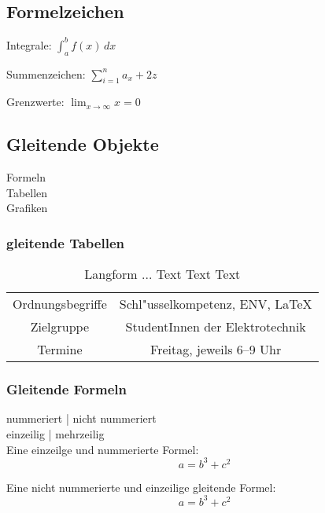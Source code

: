\documentclass[a4paper,12pt,titlepage]{article} %
\begin{document}
\subsection{Formelzeichen}
Integrale:
\begin{math}
 \int^b_a f(x)\,dx 
\end{math}

Summenzeichen:
\begin{math}
 \sum_{i=1}^n a_x +2z 
\end{math}

Grenzwerte:
\begin{math}
\lim_{x \rightarrow \infty} x=0
\end{math}

\subsection{Gleitende Objekte}
Formeln\\
Tabellen\\
Grafiken\\

\subsubsection{gleitende Tabellen}
\begin{table}[ht!] %
\centering
\caption[Kurzform]{Langform ... Text Text Text}
\label{Tab.1}
\vspace*{2ex}
  \begin{tabular}{|c|c|} %
 \hline
 Ordnungsbegriffe &
 Schl"usselkompetenz, ENV, \LaTeX \\
 \hhline{|=|=|} %
 Zielgruppe &
 StudentInnen der Elektrotechnik \\
 Termine & Freitag, jeweils 6--9 Uhr \tabularnewline[3ex]
 \hline
\end{tabular}
\end{table}

\subsubsection{Gleitende Formeln}
nummeriert | nicht nummeriert \\
einzeilig | mehrzeilig \\
Eine einzeilge und nummerierte Formel:
\begin{equation}
 a = b^3 + c^2
\end{equation}

Eine nicht nummerierte und einzeilige gleitende Formel:
\begin{displaymath}
 a = b^3 + c^2
\end{displaymath}
\end{document}
